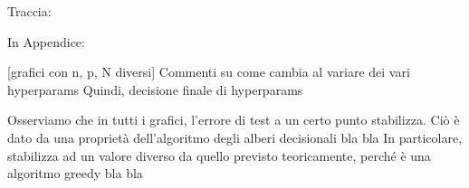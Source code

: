 Traccia: 





In Appendice:

[grafici con n, p, N diversi]
Commenti su come cambia al variare dei vari hyperparams
Quindi, decisione finale di hyperparams

Osserviamo che in tutti i grafici, l'errore di test a un certo punto stabilizza. Ciò è dato da una proprietà dell'algoritmo degli alberi decisionali bla bla
In particolare, stabilizza ad un valore diverso da quello previsto teoricamente, perché è una algoritmo greedy bla bla






